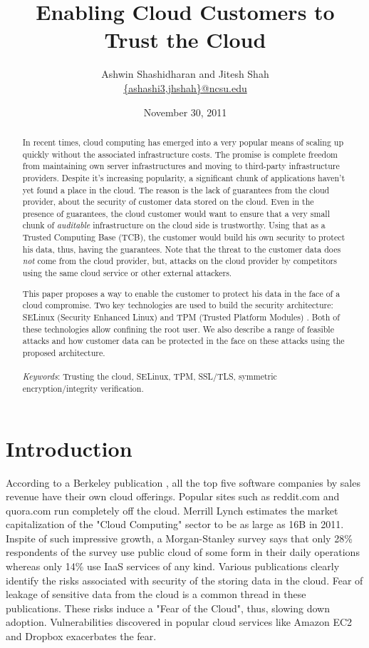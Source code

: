 \documentclass[10pt,twocolumn,pdftex]{article}
\title{Enabling Cloud Customers to Trust the Cloud}
\author{Ashwin Shashidharan and Jitesh Shah \\
\url{{ashashi3,jhshah}@ncsu.edu}
}
\date{November 30, 2011}
\begin{document}
\maketitle

\begin{abstract}
In recent times, cloud computing has emerged into a very popular \cite{adoption-survey} means of scaling up quickly without the associated infrastructure costs. The promise is complete freedom from maintaining own server infrastructures and moving to third-party infrastructure providers. Despite it's increasing popularity, a significant chunk of applications haven't yet found a place in the cloud. The reason is the lack of guarantees from the cloud provider, about the security of customer data stored on the cloud. Even in the presence of guarantees, the cloud customer would want to ensure that a very small chunk of \emph{auditable} infrastructure on the cloud side is trustworthy. Using that as a Trusted Computing Base (TCB), the customer would build his own security to protect his data, thus, having the guarantees. Note that the threat to the customer data does \emph{not} come from the cloud provider, but, attacks on the cloud provider by competitors using the same cloud service or other external attackers. 

This paper proposes a way to enable the customer to protect his data in the face of a cloud compromise. Two key technologies are used to build the security architecture: SELinux (Security Enhanced Linux) \cite{SELinux} and TPM (Trusted Platform Modules) \cite{TCG}. Both of these technologies allow confining the root user. We also describe a range of feasible attacks and how customer data can be protected in the face on these attacks using the proposed architecture.\\ \\
\emph{Keywords}:  Trusting the cloud, SELinux, TPM, SSL/TLS, symmetric encryption/integrity verification.
\end{abstract}

\section{Introduction}
According to a Berkeley publication \cite{controlling-data-in-the-cloud}, all the top five software companies by sales revenue have their own cloud offerings. Popular sites such as reddit.com and quora.com run completely off the cloud. Merrill Lynch estimates the market capitalization of the "Cloud Computing" sector to be as large as 16B in 2011. Inspite of such impressive growth, a Morgan-Stanley survey \cite{morgan-stanley} says that only 28\% respondents of the survey use public cloud of some form in their daily operations whereas only 14\% use IaaS services of any kind. Various publications \cite{controlling-data-in-the-cloud, ENISA} clearly identify the risks associated with security of the storing data in the cloud. Fear of leakage of sensitive data from the cloud is a common thread in these publications. These risks induce a "Fear of the Cloud", thus, slowing down adoption. Vulnerabilities discovered in popular cloud services like Amazon EC2 \cite{amazon-ec2-vulnerability} and Dropbox \cite{dropbox-vulnerability} exacerbates the fear. 
\end{document}
